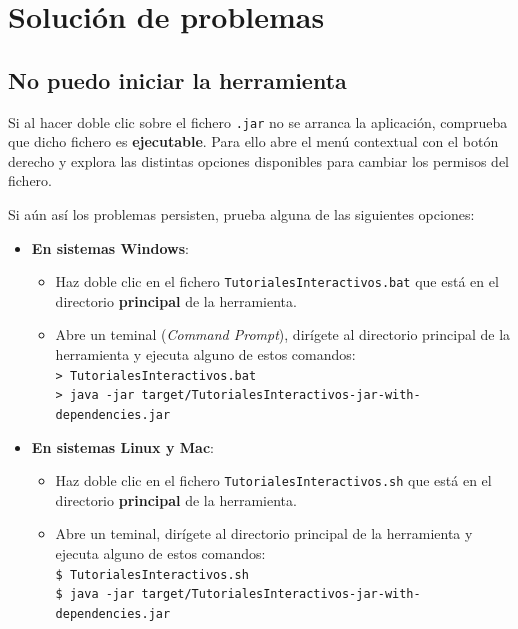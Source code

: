 \documentclass[]{article}
\begin{document}
\section{Solución de problemas}

\subsection{No puedo iniciar la herramienta}\label{sec:problemas_arrancar}
Si al hacer doble clic sobre el fichero \texttt{.jar} no se arranca la aplicación, comprueba que dicho fichero es \textbf{ejecutable}. Para ello abre el menú contextual con el botón derecho y explora las distintas opciones disponibles para cambiar los permisos del fichero.

Si aún así los problemas persisten, prueba alguna de las siguientes opciones:
\begin{itemize}
	\item \textbf{En sistemas Windows}: 
	\begin{itemize}
	\item Haz doble clic en el fichero \texttt{TutorialesInteractivos.bat} que está en el directorio \textbf{principal} de la herramienta. 
	\item Abre un teminal (\emph{Command Prompt}), dirígete al directorio principal de la herramienta y ejecuta alguno de estos comandos:
	\\
	{\small \texttt{>\ TutorialesInteractivos.bat}}\\
	{\small \texttt{>\ java -jar target/TutorialesInteractivos-jar-with-dependencies.jar}}\\
	\end{itemize}
	\item \textbf{En sistemas Linux y Mac}:
	\begin{itemize}
		\item Haz doble clic en el fichero \texttt{TutorialesInteractivos.sh} que está en el directorio \textbf{principal} de la herramienta. 
		\item Abre un teminal, dirígete al directorio principal de la herramienta y ejecuta alguno de estos comandos:
		\\
		{\small \texttt{\$ TutorialesInteractivos.sh}}\\
		{\small \texttt{\$ java -jar target/TutorialesInteractivos-jar-with-dependencies.jar}}\\
	\end{itemize}
\end{itemize}	
	
\end{document}
